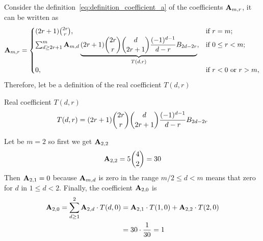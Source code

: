 Consider the definition~\eqref{eq:definition_coefficient_a} of the coefficients ${\mathbf{A}} \sb{m,r}$, it can be written as
\begin{equation*}
    {\mathbf{A}} \sb{m,r} =
    \begin{cases}
    (2r+1)
        \binom{2r}{r}, & \text{if } r=m; \\
        \sum_{d \geq 2r+1}^{m} {\mathbf{A}} \sb{m,d} \underbrace{(2r+1) \binom{2r}{r} \binom{d}{2r+1} \frac{(-1)^{d-1}}{d-r} {B}\sb{2d-2r}}_{T(d,r)}, & \text{if } 0 \leq r<m; \\
        0, & \text{if } r<0 \text{ or } r>m,
    \end{cases}
\end{equation*}
Therefore, let be a definition of the real coefficient $T(d,r)$
\begin{defn}
    Real coefficient $T(d,r)$
    \begin{equation*}
        T(d,r) = (2r+1) \binom{2r}{r} \binom{d}{2r+1} \frac{(-1)^{d-1}}{d-r} {B}\sb{2d-2r}
    \end{equation*}
\end{defn}
\begin{examp}
    Let be $m=2$ so first we get ${\mathbf{A}} \sb{2,2}$
    \begin{equation*}
        {\mathbf{A}} \sb{2,2} = 5\binom{4}{2}=30
    \end{equation*}
    Then ${\mathbf{A}} \sb{2,1} = 0$ because ${\mathbf{A}} \sb{m,d}$ is zero in the range $m/2 \leq d < m$ means that zero for $d$
    in $1 \leq d < 2$.
    Finally, the coefficient ${\mathbf{A}} \sb{2,0}$ is
    \begin{equation*}
        \begin{split}
            {\mathbf{A}} \sb{2,0}
            = \sum_{d \geq 1}^{2} {\mathbf{A}} \sb{2,d} \cdot T(d, 0)
            &= {\mathbf{A}} \sb{2,1} \cdot T(1, 0) + {\mathbf{A}} \sb{2,2} \cdot T(2, 0) \\
            &= 30 \cdot \frac{1}{30} = 1
        \end{split}
    \end{equation*}
\end{examp}
